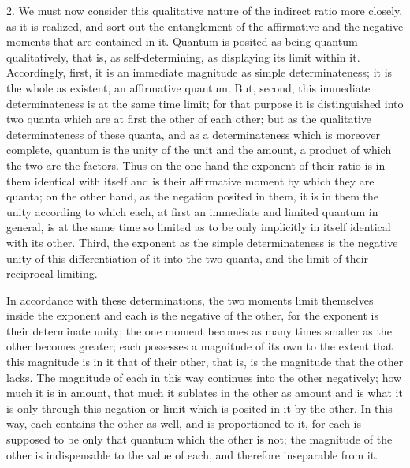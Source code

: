 2. We must now consider this qualitative nature
of the indirect ratio more closely, as it is realized,
and sort out the entanglement of the affirmative
and the negative moments that are contained in it.
Quantum is posited as being quantum qualitatively,
that is, as self-determining,
as displaying its limit within it.
Accordingly, first, it is an immediate magnitude
as simple determinateness;
it is the whole as existent, an affirmative quantum.
But, second, this immediate determinateness is
at the same time limit;
for that purpose it is distinguished into two quanta
which are at first the other of each other;
but as the qualitative determinateness of these quanta,
and as a determinateness which is moreover complete,
quantum is the unity of the unit and the amount,
a product of which the two are the factors.
Thus on the one hand the exponent of their ratio
is in them identical with itself
and is their affirmative moment by which they are quanta;
on the other hand, as the negation posited in them,
it is in them the unity according to which each,
at first an immediate and limited quantum in general,
is at the same time so limited as to be
only implicitly in itself identical with its other.
Third, the exponent as the simple determinateness is
the negative unity of this differentiation of it into the two quanta,
and the limit of their reciprocal limiting.

In accordance with these determinations,
the two moments limit themselves inside the exponent
and each is the negative of the other,
for the exponent is their determinate unity;
the one moment becomes as many
times smaller as the other becomes greater;
each possesses a magnitude of its own
to the extent that this magnitude is in it that of their other,
that is, is the magnitude that the other lacks.
The magnitude of each in this way
continues into the other negatively;
how much it is in amount,
that much it sublates in the other as amount
and is what it is only through this negation
or limit which is posited in it by the other.
In this way, each contains the other as well,
and is proportioned to it,
for each is supposed to be only that quantum
which the other is not;
the magnitude of the other is
indispensable to the value of each,
and therefore inseparable from it.

